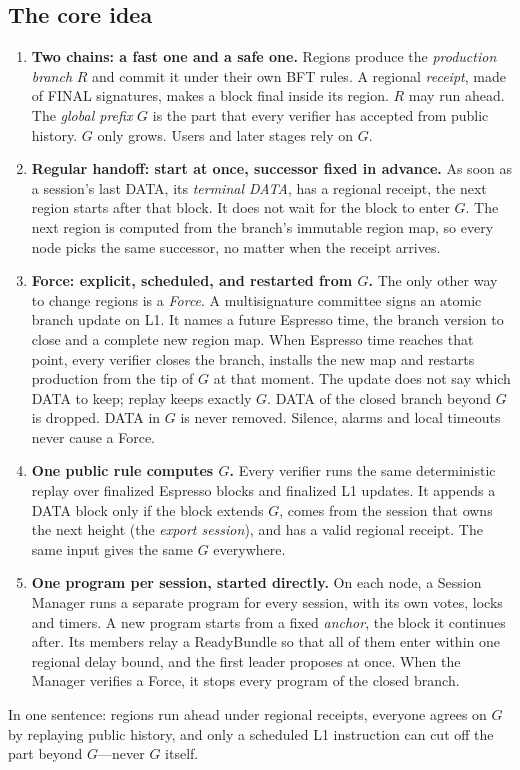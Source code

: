 \documentclass[11pt,a4paper]{article}
\newcommand{\defterm}[1]{\textcolor{rrBlue}{\textit{#1}}}
\begin{document}
\subsection{The core idea}
\label{sec:core-idea}
\begin{mdframed}[linewidth=.6pt,backgroundcolor=rrBlue!4,nobreak=true,
innertopmargin=6pt,innerbottommargin=6pt]
\begin{enumerate}[label=\textbf{\arabic*.},itemsep=4pt]
\item \textbf{Two chains: a fast one and a safe one.} Regions produce the
\defterm{production branch} $R$ and commit it under their own BFT rules.
A regional \emph{receipt}, made of FINAL signatures, makes a block final
inside its region. $R$ may run ahead. The \defterm{global prefix} $G$ is
the part that every verifier has accepted from public history. $G$ only
grows. Users and later stages rely on $G$.
\item \textbf{Regular handoff: start at once, successor fixed in
advance.} As soon as a session's last DATA, its \emph{terminal DATA}, has
a regional receipt, the next region starts after that block. It does not
wait for the block to enter $G$. The next region is computed from the
branch's immutable region map, so every node picks the same successor,
no matter when the receipt arrives.
\item \textbf{Force: explicit, scheduled, and restarted from $G$.} The
only other way to change regions is a \defterm{Force}. A multisignature
committee signs an atomic branch update on L1. It names a future Espresso
time, the branch version to close and a complete new region map. When
Espresso time reaches that point, every verifier closes the branch,
installs the new map and restarts production from the tip of $G$ at that
moment. The update does not say which DATA to keep; replay keeps exactly
$G$. DATA of the closed branch beyond $G$ is dropped. DATA in $G$ is never
removed. Silence, alarms and local timeouts never cause a Force.
\item \textbf{One public rule computes $G$.} Every verifier runs the same
deterministic replay over finalized Espresso blocks and finalized L1
updates. It appends a DATA block only if the block extends $G$, comes
from the session that owns the next height (the \emph{export session}),
and has a valid regional receipt. The same input gives the same $G$
everywhere.
\item \textbf{One program per session, started directly.} On each node, a
Session Manager runs a separate program for every session, with its own
votes, locks and timers. A new program starts from a fixed
\emph{anchor}, the block it continues after. Its members relay a
ReadyBundle so that all of them enter within one regional delay bound,
and the first leader proposes at once. When the Manager verifies a
Force, it stops every program of the closed branch.
\end{enumerate}
\end{mdframed}
In one sentence: regions run ahead under regional receipts, everyone
agrees on $G$ by replaying public history, and only a scheduled L1
instruction can cut off the part beyond $G$---never $G$ itself.
\end{document}
